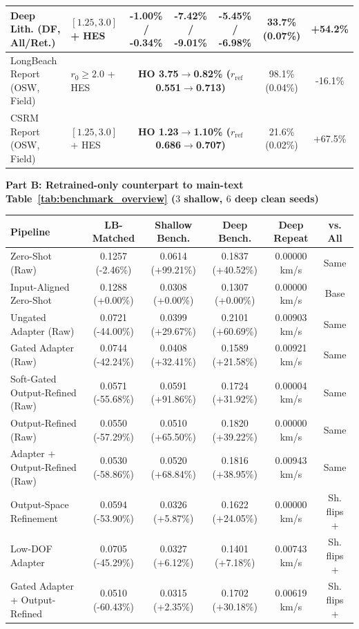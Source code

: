\begin{table}[width=\textwidth,pos=htbp]
\begin{tabular*}{\textwidth}{@{\extracolsep{\fill}}llccccc}
Deep Lith. (DF, All/Ret.) & $[1.25, 3.0]$ + HES & -1.00\% / -0.34\% & -7.42\% / -9.01\% & \textbf{-5.45\% / -6.98\%} & 33.7\% (0.07\%) & +54.2\% \\
\midrule
LongBeach Report (OSW, Field) & $r_0 \ge 2.0$ + HES & \multicolumn{3}{c}{\textbf{HO 3.75$\to$0.82\% ($r_{\text{ref}}$ 0.551$\to$0.713)}} & 98.1\% (0.04\%) & -16.1\% \\
CSRM Report (OSW, Field) & $[1.25, 3.0]$ + HES & \multicolumn{3}{c}{\textbf{HO 1.23$\to$1.10\% ($r_{\text{ref}}$ 0.686$\to$0.707)}} & 21.6\% (0.02\%) & +67.5\% \\
\bottomrule
\end{tabular*}

\vspace{4pt}
\noindent\textbf{Part B: Retrained-only counterpart to main-text Table~\ref{tab:benchmark_overview} ($3$ shallow, $6$ deep clean seeds)}\\[2pt]
\begin{tabular*}{\textwidth}{@{\extracolsep{\fill}}lccccc}
\toprule
Pipeline & LB-Matched & Shallow Bench. & Deep Bench. & Deep Repeat & vs. All \\
\midrule
Zero-Shot (Raw) & 0.1257 (-2.46\%) & 0.0614 (+99.21\%) & 0.1837 (+40.52\%) & 0.00000 km/s & Same \\
Input-Aligned Zero-Shot & 0.1288 (+0.00\%) & 0.0308 (+0.00\%) & 0.1307 (+0.00\%) & 0.00000 km/s & Base \\
Ungated Adapter (Raw) & 0.0721 (-44.00\%) & 0.0399 (+29.67\%) & 0.2101 (+60.69\%) & 0.00903 km/s & Same \\
Gated Adapter (Raw) & 0.0744 (-42.24\%) & 0.0408 (+32.41\%) & 0.1589 (+21.58\%) & 0.00921 km/s & Same \\
Soft-Gated Output-Refined (Raw) & 0.0571 (-55.68\%) & 0.0591 (+91.86\%) & 0.1724 (+31.92\%) & 0.00004 km/s & Same \\
Output-Refined (Raw) & 0.0550 (-57.29\%) & 0.0510 (+65.50\%) & 0.1820 (+39.22\%) & 0.00000 km/s & Same \\
Adapter + Output-Refined (Raw) & 0.0530 (-58.86\%) & 0.0520 (+68.84\%) & 0.1816 (+38.95\%) & 0.00943 km/s & Same \\
Output-Space Refinement & 0.0594 (-53.90\%) & 0.0326 (+5.87\%) & 0.1622 (+24.05\%) & 0.00000 km/s & Sh. flips + \\
Low-DOF Adapter & 0.0705 (-45.29\%) & 0.0327 (+6.12\%) & 0.1401 (+7.18\%) & 0.00743 km/s & Sh. flips + \\
Gated Adapter + Output-Refined & 0.0510 (-60.43\%) & 0.0315 (+2.35\%) & 0.1702 (+30.18\%) & 0.00619 km/s & Sh. flips + \\
\bottomrule
\end{tabular*}


\end{table}
